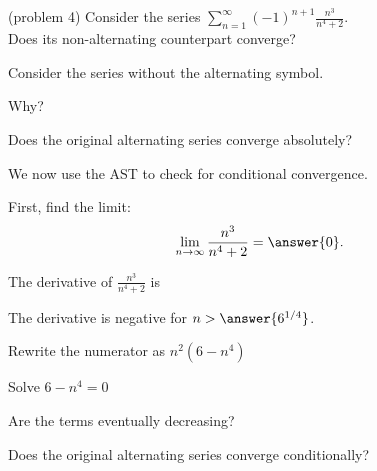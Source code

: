 \documentclass[handout]{ximera}
\begin{document}
\begin{problem}(problem 4)
Consider the series $\displaystyle{\sum_{n=1}^\infty (-1)^{n+1} \frac{n^3}{n^4 + 2}}$.\\
Does its non-alternating counterpart converge?
\begin{hint} 
Consider the series without the alternating symbol.
\end{hint}
\begin{multipleChoice}
\end{multipleChoice}

Why?
\begin{multipleChoice}
\end{multipleChoice}




Does the original alternating series converge absolutely?
\begin{multipleChoice}
\end{multipleChoice}

We now use the AST to check for conditional convergence.

First, find the limit:
\[
\lim_{n\to\infty} \frac{n^3}{n^4 + 2} = \answer{0}.
\]

The derivative of $\displaystyle{\frac{n^3}{n^4 + 2}}$ is  

\begin{multipleChoice}
\end{multipleChoice}


The derivative is negative for $n > \answer{6^{1/4}}$.
\begin{hint}
Rewrite the numerator as $n^2(6-n^4)$
\end{hint}
\begin{hint}
Solve $6 - n^4 = 0$
\end{hint}

Are the terms eventually decreasing?
\begin{multipleChoice}
\end{multipleChoice}


Does the original alternating series converge conditionally?
\begin{multipleChoice}
\end{multipleChoice}


\end{problem}
\end{document}
